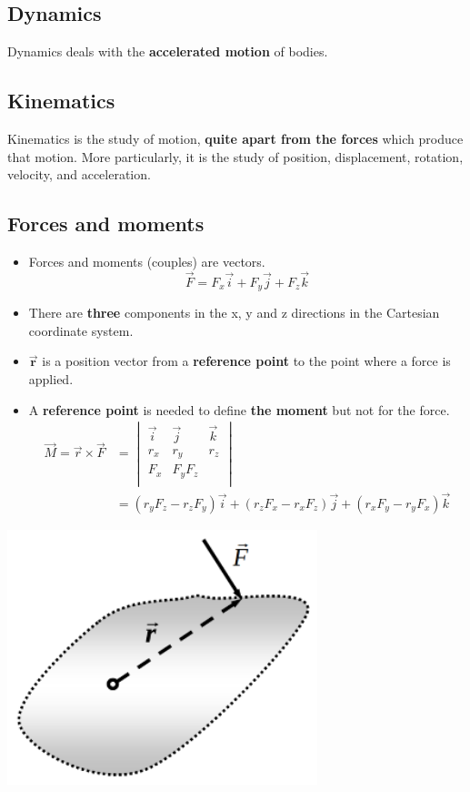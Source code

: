 \documentclass[11pt]{article}
\begin{document}
\subsection{Dynamics}
\label{sec:org8a91321}
Dynamics deals with the \textbf{accelerated motion} of bodies.
\subsection{Kinematics}
\label{sec:org48777f2}
Kinematics is the study of motion, \textbf{quite apart from the forces} which produce that motion. More particularly, it is the study of position, displacement, rotation, velocity, and acceleration.

 \newpage
\subsection{Forces and moments}
\label{sec:org8c15bdc}
\begin{itemize}
\item Forces and moments (couples) are vectors.
\[\vec{F} = F_x \vec{i} + F_y \vec{j} + F_z \vec{k}\]
\item There are \textbf{three} components in the x, y and z directions in the Cartesian coordinate system.
\item \(\boldsymbol{\vec{r}}\) is a position vector from a \textbf{reference point} to the point where a force is applied.
\item A \textbf{reference point} is needed to define \textbf{the moment} but not for the force.
\begin{align*}
\vec{M} = \vec{r} \times \vec{F} &= \begin{vmatrix}
\vec{i} & \vec{j} & \vec{k} \\
r_x & r_y & r_z \\
F_x & F_y F_z \\
\end{vmatrix} \\
&= (r_y F_z - r_z F_y) \vec{i} + (r_z F_x - r_x F_z) \vec{j} + (r_x F_y - r_y F_x) \vec{k}
\end{align*}
\end{itemize}

\begin{center}
\includegraphics[height=20em]{./images/forces-and-moments.png}
\end{center}
\end{document}
